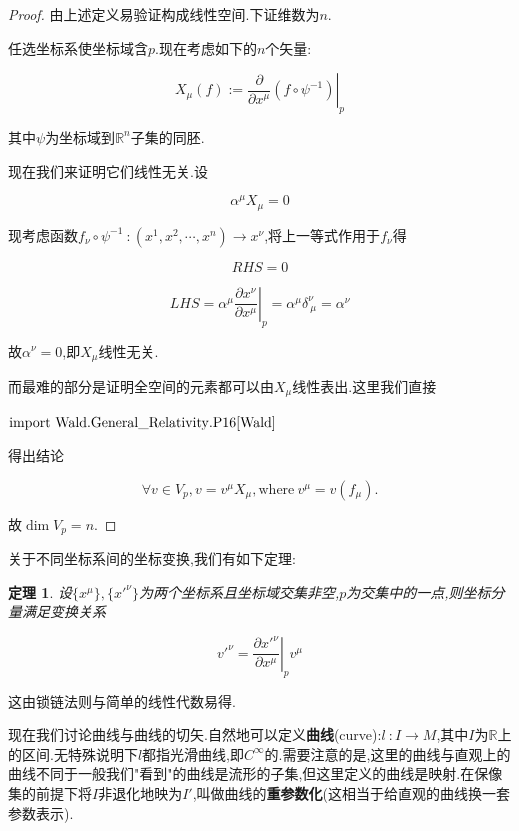 \documentclass[UTF8]{article}
\begin{document}
	\begin{proof}
		
		由上述定义易验证构成线性空间.下证维数为$n$.
		
		任选坐标系使坐标域含$p$.现在考虑如下的$n$个矢量:
		
		\[X_{\mu}(f) := \left.\frac{\partial}{\partial x^{\mu}} (f \circ \psi^{-1})\right|_{p}\]
		
		其中$\psi$为坐标域到$\mathbb{R}^n$子集的同胚.
		
		现在我们来证明它们线性无关.设
		
		\[\alpha^{\mu}X_{\mu} = 0\]
		
		现考虑函数$f_{\nu} \circ \psi^{-1}~:(x^1,x^2,\cdots,x^n) \to x^{\nu}$,将上一等式作用于$f_{\nu}$得
		
		\[RHS = 0\]
		
		\[LHS = \alpha^{\mu} \left.\frac{\partial x^{\nu}}{\partial x^{\mu}}\right|_{p} = \alpha^{\mu} \delta^{\nu}_{~\mu} = \alpha^{\nu}\]
		
		故$\alpha^{\nu} = 0$,即$X_{\mu}$线性无关.
		
		而最难的部分是证明全空间的元素都可以由$X_{\mu}$线性表出.这里我们直接
		
		$\mathrm{import~Wald.General\_Relativity.P16}\cite{Wald}$
		
		得出结论
		
		\[\forall v \in V_{p}, v = v^{\mu} X_{\mu}, \text{where}~v^{\mu} = v(f_{\mu}).\]
		
		故$\dim V_{p} = n$.
		
	\end{proof}
	
	关于不同坐标系间的坐标变换,我们有如下定理:
	
	\newtheorem*{coordinateTransform}{定理}
	
	\begin{coordinateTransform}
		
		设$\{x^\mu\},\{x'^{\nu}\}$为两个坐标系且坐标域交集非空,$p$为交集中的一点,则坐标分量满足变换关系
		
		\[v'^{\nu} = \left.\frac{\partial x'^{\nu}}{\partial x^{\mu}}\right|_{p} v^{\mu}\]
		
	\end{coordinateTransform}
	
	这由锁链法则与简单的线性代数易得.
	
	现在我们讨论曲线与曲线的切矢.自然地可以定义\textbf{曲线}(curve):$l~:I \to M$,其中$I$为$\mathbb{R}$上的区间.无特殊说明下$l$都指光滑曲线,即$C^{\infty}$的.需要注意的是,这里的曲线与直观上的曲线不同于一般我们"看到"的曲线是流形的子集,但这里定义的曲线是映射.在保像集的前提下将$I$非退化地映为$I'$,叫做曲线的\textbf{重参数化}(这相当于给直观的曲线换一套参数表示).
	
\end{document}
